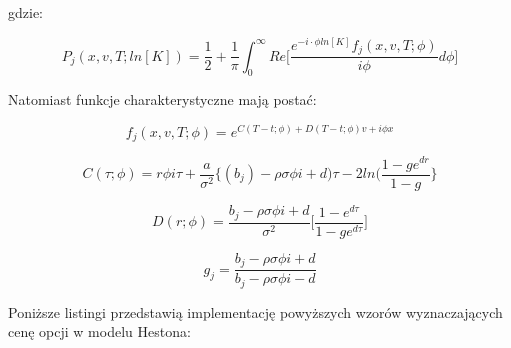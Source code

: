 \documentclass{pracamgr}
\begin{document}
gdzie:


\begin{equation}
  P_j (x, v, T; ln[K]) = \frac{1}{2} + \frac{1}{\pi} \int_{0}^{\infty} Re \bigg[ \frac{e^{-i \cdot \phi ln[K]} f_j(x, v, T; \phi) }{i \phi} d \phi \bigg]
\end{equation}

Natomiast funkcje charakterystyczne mają postać: 

\begin{equation}
   f_j(x, v, T; \phi) = e^{C(T-t; \phi) + D(T-t; \phi)v + i \phi x}
\end{equation}

\begin{equation}
  C (\tau; \phi) = r \phi i \tau + \frac{a}{\sigma^2} \bigg\{ (b_j) - \rho \sigma \phi i + d) \tau - 2 ln (\frac{1 - ge^{dr}}{1-g} \bigg\}
\end{equation}

\begin{equation}
D (r; \phi)  = \frac{b_j- \rho \sigma \phi i + d}{\sigma^2} \bigg[ \frac{1 - e^{d\tau}}{1 - ge^{d\tau}} \bigg]  
\end{equation}

\begin{equation}
g_j= \frac{b_j - \rho \sigma \phi i + d}{b_j - \rho \sigma \phi i - d}
\end{equation}

Poniższe listingi przedstawią implementację powyższych wzorów wyznaczających cenę opcji w modelu Hestona:




\end{document}
